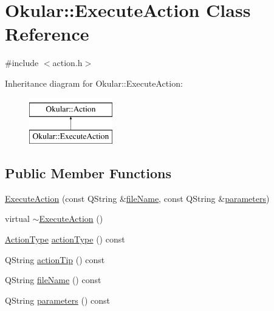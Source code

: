 \hypertarget{classOkular_1_1ExecuteAction}{\section{Okular\+:\+:Execute\+Action Class Reference}
\label{classOkular_1_1ExecuteAction}
}


{\ttfamily \#include $<$action.\+h$>$}

Inheritance diagram for Okular\+:\+:Execute\+Action\+:\begin{figure}[H]
\begin{center}
\leavevmode
\includegraphics[height=2.000000cm]{classOkular_1_1ExecuteAction}
\end{center}
\end{figure}
\subsection*{Public Member Functions}
\begin{DoxyCompactItemize}
\item 
\hyperlink{classOkular_1_1ExecuteAction_a934d2e231b090fdf1abe647edb44170b}{Execute\+Action} (const Q\+String \&\hyperlink{classOkular_1_1ExecuteAction_a9deef6fa77e658cc0bf65fb811209c28}{file\+Name}, const Q\+String \&\hyperlink{classOkular_1_1ExecuteAction_a5c2b9ecd8b20b9ff12edb792c04132ea}{parameters})
\item 
virtual \hyperlink{classOkular_1_1ExecuteAction_a4b4fb3bd8070c78a56b00fbb0a968988}{$\sim$\+Execute\+Action} ()
\item 
\hyperlink{classOkular_1_1Action_abe474735af30ea76105595533df9ec47}{Action\+Type} \hyperlink{classOkular_1_1ExecuteAction_ac9d8d732913d262931c07eef33595f6d}{action\+Type} () const 
\item 
Q\+String \hyperlink{classOkular_1_1ExecuteAction_a60177f711289c231994888281d9d6b67}{action\+Tip} () const 
\item 
Q\+String \hyperlink{classOkular_1_1ExecuteAction_a9deef6fa77e658cc0bf65fb811209c28}{file\+Name} () const 
\item 
Q\+String \hyperlink{classOkular_1_1ExecuteAction_a5c2b9ecd8b20b9ff12edb792c04132ea}{parameters} () const 
\end{DoxyCompactItemize}
